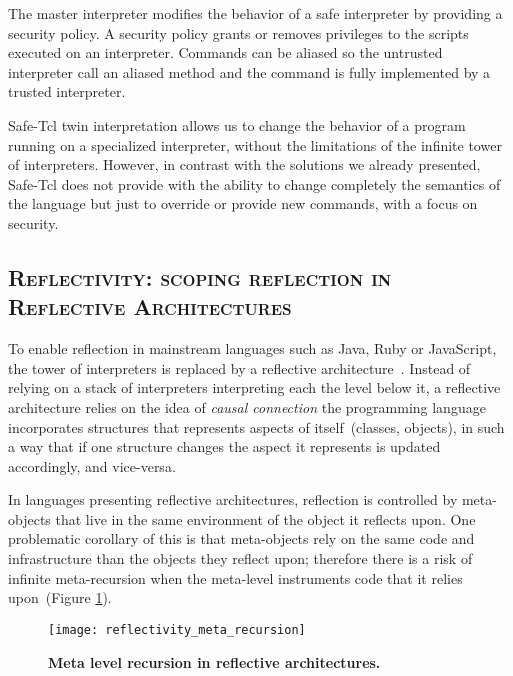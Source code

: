 The master interpreter modifies the behavior of a safe interpreter by providing a security policy. A security policy grants or removes privileges to the scripts executed on an interpreter. Commands can be aliased so the untrusted interpreter call an aliased method and the command is fully implemented by a trusted interpreter.

Safe-Tcl twin interpretation allows us to change the behavior of a program running on a specialized interpreter, without the limitations of the infinite tower of interpreters. However, in contrast with the solutions we already presented, Safe-Tcl does not provide with the ability to change completely the semantics of the language but just to override or provide new commands, with a focus on security.

\subsection*{\textsc{Reflectivity: scoping reflection in Reflective Architectures}}

To enable reflection in mainstream languages such as Java, Ruby or JavaScript, the tower of interpreters is replaced by a reflective architecture~\cite{Maes87a}. Instead of relying on a stack of interpreters interpreting each the level below it, a reflective architecture relies on the idea of \emph{causal connection} \ie the programming language incorporates structures that represents aspects of itself~(\eg classes, objects), in such a way that if one structure changes the aspect it represents is updated accordingly, and vice-versa.


In languages presenting reflective architectures, reflection is controlled by meta-objects that live in the same environment of the object it reflects upon.
One problematic corollary of this is that meta-objects rely on the same code and infrastructure than the objects they reflect upon; therefore there is a risk of infinite meta-recursion when the meta-level instruments code that it relies upon~(Figure \ref{fig:reflectivity_meta_recursion}).

\begin{figure}[ht]
\begin{center}
\texttt{[image: reflectivity\_meta\_recursion]}
\caption{\textbf{Meta level recursion in reflective architectures.}\label{fig:reflectivity_meta_recursion}
 }
\end{center}
\end{figure}

